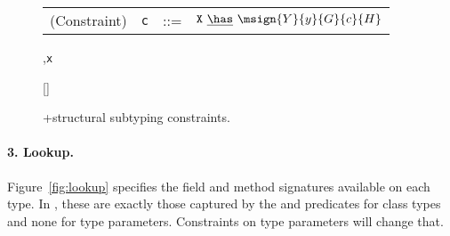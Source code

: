 \begin{figure*}
\begin{minipage}{.45\textwidth}
\centering
\begin{tabular}{r@{\quad}rcl}
  (Constraint) & {\tt c} &{::=}& ${\tt X}~\underline{\has}~\msign{Y}{y}{G}{c}{H}$
\end{tabular}

\end{minipage}%
\begin{minipage}{.55\textwidth}
\vspace{-\bigskipamount}
\quad{}
  {\Gamma,{\tt x}~\has~}
\end{minipage}%

\begin{minipage}{\textwidth}
\quad{}
	{}
\end{minipage}%

\begin{minipage}{.4\textwidth}
\quad{}
  {[]~\underline\has~}
\end{minipage}%
\begin{minipage}{.6\textwidth}
\quad{}
	{\Gamma\vdash\false}
\end{minipage}%
\caption{\FXG+structural subtyping constraints.}
\label{fig:FXGS}
\end{figure*}


\paragraph{3. Lookup.} Figure~\ref{fig:lookup} specifies the field and method signatures available on each type. In , these are exactly those captured by the \fields{} and \methods{} predicates for class types and none for type parameters. Constraints on type parameters will change that.

